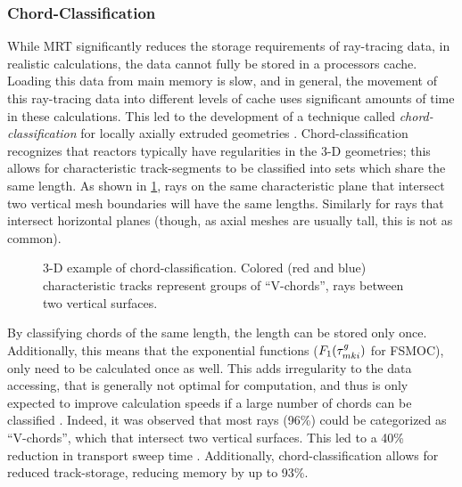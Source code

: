 {{{        \subsubsection{Chord-Classification}{\label{sssec:RT:Chord-Classification}
          While \ac{MRT} significantly reduces the storage requirements of ray-tracing data, in realistic calculations, the data cannot fully be stored in a processors cache.
          Loading this data from main memory is slow, and in general, the movement of this ray-tracing data into different levels of cache uses significant amounts of time in these calculations.
          This led to the development of a technique called \emph{chord-classification} for locally axially extruded geometries \cite{Sciannandrone2016}.
          Chord-classification recognizes that reactors typically have regularities in the 3-D geometries; this allows for characteristic track-segments to be classified into sets which share the same length.
          As shown in \cref{fig:RT:Chord-Classification}, rays on the same characteristic plane that intersect two vertical mesh boundaries will have the same lengths.
          Similarly for rays that intersect horizontal planes (though, as axial meshes are usually tall, this is not as common).

          \begin{figure}[h]
            \centering
            \def\svgwidth{0.45\linewidth}
            
            \caption{3-D example of chord-classification. Colored (red and blue) characteristic tracks represent groups of ``V-chords'', rays between two vertical surfaces.}
            \label{fig:RT:Chord-Classification}
          \end{figure}

          By classifying chords of the same length, the length can be stored only once.
          Additionally, this means that the exponential functions ($F_1(\segopt)$ for \ac{FSMOC}), only need to be calculated once as well.
          This adds irregularity to the data accessing, that is generally not optimal for computation, and thus is only expected to improve calculation speeds if a large number of chords can be classified \cite{Sciannandrone2016}.
          Indeed, it was observed that most rays (96\%) could be categorized as ``V-chords'', which that intersect two vertical surfaces.
          This led to a 40\% reduction in transport sweep time \cite{Sciannandrone2016}.
          Additionally, chord-classification allows for reduced track-storage, reducing memory by up to 93\%.
        }

}}}

